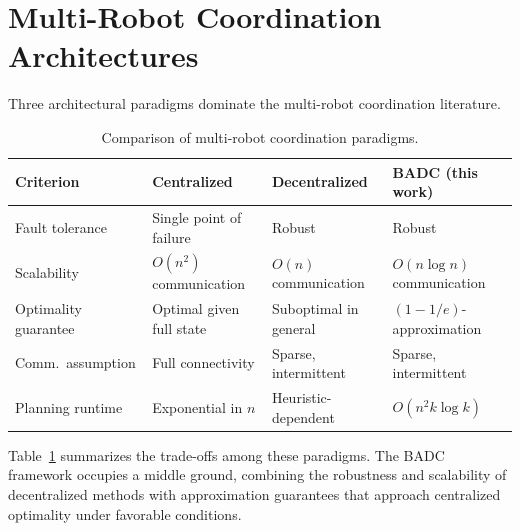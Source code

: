 \section{Multi-Robot Coordination Architectures}

Three architectural paradigms dominate the multi-robot coordination literature.

\begin{table}[htbp]
\centering
\caption{Comparison of multi-robot coordination paradigms.}
\label{tab:paradigms}
\vspace{4pt}
\begin{tabular}{@{}p{2.5cm} p{3.2cm} p{3.2cm} p{3.2cm}@{}}
\toprule
\color{jhublue}\textbf{Criterion} &
\color{jhublue}\textbf{Centralized} &
\color{jhublue}\textbf{Decentralized} &
\color{jhublue}\textbf{BADC (this work)} \\
\midrule
Fault tolerance    & Single point of failure    & Robust                     & Robust                        \\
Scalability        & $O(n^2)$ communication      & $O(n)$ communication        & $O(n \log n)$ communication   \\
Optimality guarantee& Optimal given full state    & Suboptimal in general       & $(1-1/e)$-approximation       \\
Comm.\ assumption  & Full connectivity           & Sparse, intermittent        & Sparse, intermittent          \\
Planning runtime   & Exponential in $n$          & Heuristic-dependent         & $O(n^2 k \log k)$             \\
\bottomrule
\end{tabular}
\vspace{4pt}
\end{table}

Table~\ref{tab:paradigms} summarizes the trade-offs among these paradigms.
The BADC framework occupies a middle ground, combining the robustness and
scalability of decentralized methods with approximation guarantees that
approach centralized optimality under favorable conditions.

